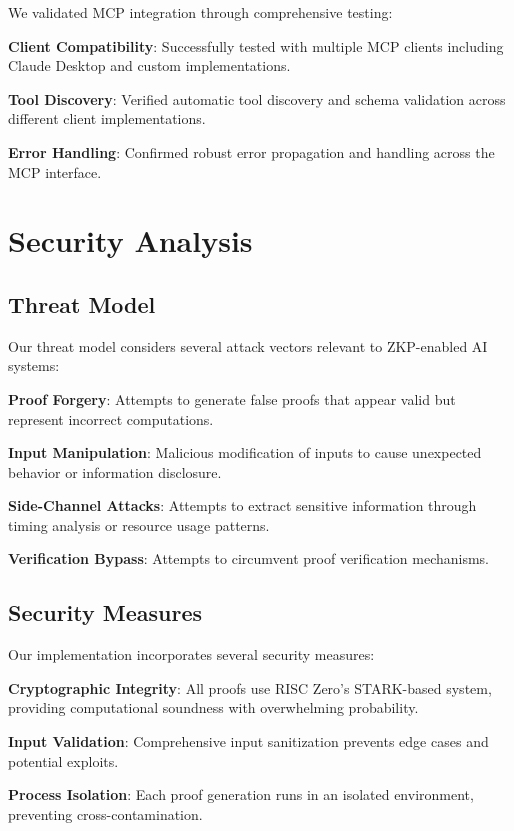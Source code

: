 \documentclass[11pt]{article}
\begin{document}
We validated MCP integration through comprehensive testing:

\textbf{Client Compatibility}: Successfully tested with multiple MCP clients including Claude Desktop and custom implementations.

\textbf{Tool Discovery}: Verified automatic tool discovery and schema validation across different client implementations.

\textbf{Error Handling}: Confirmed robust error propagation and handling across the MCP interface.

\section{Security Analysis}
\label{sec:security}

\subsection{Threat Model}

Our threat model considers several attack vectors relevant to ZKP-enabled AI systems:

\textbf{Proof Forgery}: Attempts to generate false proofs that appear valid but represent incorrect computations.

\textbf{Input Manipulation}: Malicious modification of inputs to cause unexpected behavior or information disclosure.

\textbf{Side-Channel Attacks}: Attempts to extract sensitive information through timing analysis or resource usage patterns.

\textbf{Verification Bypass}: Attempts to circumvent proof verification mechanisms.

\subsection{Security Measures}

Our implementation incorporates several security measures:

\textbf{Cryptographic Integrity}: All proofs use RISC Zero's STARK-based system, providing computational soundness with overwhelming probability.

\textbf{Input Validation}: Comprehensive input sanitization prevents edge cases and potential exploits.

\textbf{Process Isolation}: Each proof generation runs in an isolated environment, preventing cross-contamination.
\end{document}
